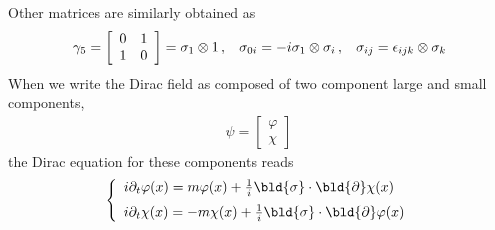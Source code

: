 Other matrices are similarly obtained as
\begin{eqnarray}
\gamma_5
=
\left[
\begin{array}{cc}
0 & 1 \\ 1 & 0
\end{array}
\right]
= \sigma_1 \otimes 1\,,
\hspace{3mm}
\sigma_{0 i} = -i  \sigma_1 \otimes \sigma_i\,,
\hspace{3mm}
\sigma_{i j} = \epsilon_{ijk} \otimes \sigma_k
\end{eqnarray}
When we write the Dirac field as composed of two component 
large and small components,
\begin{eqnarray}
\psi =
\left[
\begin{array}{c}
\varphi \\ \chi
\end{array}
\right]\,
\end{eqnarray}
the Dirac equation for these components reads
\begin{eqnarray}
\left\{
\begin{array}{l}
i \partial_t \varphi(x)
=
m \varphi(x) + \frac{1}{i} \bld{\sigma} \cdot \bld{\partial} \chi(x)
\vspace{2mm}
\\
i \partial_t \chi(x)
=
-m \chi(x) + \frac{1}{i} \bld{\sigma} \cdot \bld{\partial} \varphi(x)
\end{array}
\right.
\end{eqnarray}
\\


